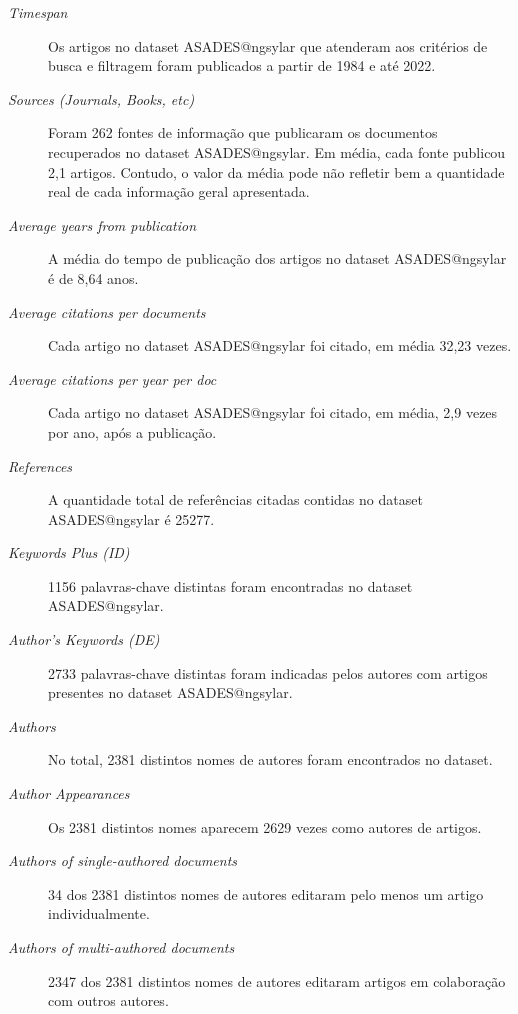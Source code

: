\begin{description}
\item [\textit{Timespan}] Os artigos no dataset ASADES@ngsylar que atenderam aos critérios de busca e filtragem foram publicados a partir de 1984 e até 2022.

\item [\textit{Sources (Journals, Books, etc)}] Foram 262 fontes de informação que publicaram os documentos recuperados no dataset ASADES@ngsylar. Em média, cada fonte publicou 2,1 artigos. Contudo, o valor da média pode não refletir bem a quantidade real de cada informação geral apresentada.

\item [\textit{Average years from publication}] A média do tempo de publicação dos artigos no dataset ASADES@ngsylar é de 8,64 anos.

\item [\textit{Average citations per documents}] Cada artigo no dataset ASADES@ngsylar foi citado, em média 32,23 vezes.

\item [\textit{Average citations per year per doc}] Cada artigo no dataset ASADES@ngsylar foi citado, em média, 2,9 vezes por ano, após a publicação.

\item [\textit{References}] A quantidade total de referências citadas contidas no dataset ASADES@ngsylar é 25277.

\item [\textit{Keywords Plus (ID)}] 1156 palavras-chave distintas foram encontradas no dataset ASADES@ngsylar.

\item [\textit{Author’s Keywords (DE)}] 2733 palavras-chave distintas foram indicadas pelos autores com artigos presentes no dataset ASADES@ngsylar.

\item [\textit{Authors}] No total, 2381 distintos nomes de autores foram encontrados no dataset.

\item [\textit{Author Appearances}] Os 2381 distintos nomes aparecem 2629 vezes como autores de artigos.

\item [\textit{Authors of single-authored documents}] 34 dos 2381 distintos nomes de autores editaram pelo menos um artigo individualmente.

\item [\textit{Authors of multi-authored documents}] 2347 dos 2381 distintos nomes de autores editaram artigos em colaboração com outros autores.


\end{description}
